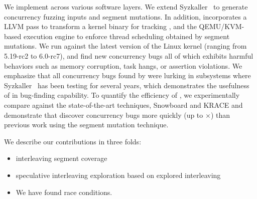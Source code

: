 We implement \sys across various software layers.
We extend Syzkaller~\cite{syzkaller} to generate concurrency fuzzing inputs 
and segment mutations. 
%
In addition, \sys incorporates a LLVM pass to transform a kernel
binary for tracking \intcov, and the QEMU/KVM-based execution engine
to enforce thread scheduling obtained by segment mutations. 
%
We run \sys against the latest version of the Linux kernel (ranging
from 5.19-rc2 to 6.0-rc7), and find new \totalbugs concurrency bugs all of
which exhibits harmful behaviors such as memory corruption,
task hangs, or assertion violations. We emphasize that all
concurrency bugs found by \sys were lurking in subsystems where
Syzkaller~\cite{syzkaller} has been testing for several years, which
demonstrates the usefulness of \sys in bug-finding capability.
%
To quantify the efficiency of \sys, we experimentally compare \sys 
against the state-of-the-art techniques, Snowboard and KRACE and 
demonstrate that \sys discover concurrency bugs more quickly 
(up to $\times$) than previous work using the segment mutation 
technique.

We describe our contributions in three folds:

\begin{itemize}
\item interleaving segment coverage
\item speculative interleaving exploration based on explored interleaving
\item We have found \totalbugs race conditions.
\end{itemize}

